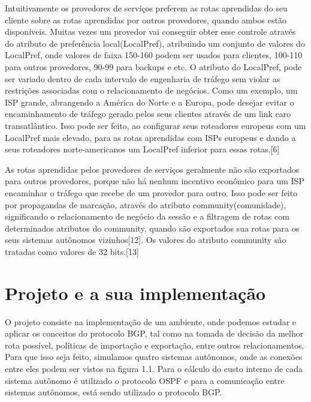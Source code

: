\documentclass[12pt,a4paper]{report}
\begin{document}
Intuitivamente os provedores de servi\c{c}os preferem as rotas aprendidas do seu cliente sobre as rotas aprendidas por outros provedores, quando ambos est\~ao dispon\'iveis. Muitas vezes um provedor vai conseguir obter esse controle atrav\'es do atributo de prefer\^encia local(LocalPref), atribuindo um conjunto de valores do LocalPref, onde valores de faixa 150-160 podem ser usados para clientes, 100-110 para outros provedores, 90-99 para backups e etc. O atributo do LocalPref, pode ser variado dentro de cada intervalo de engenharia de tr\'afego sem violar as restri\c{c}\~oes associadas com o relacionamento de neg\'ocios. Como um exemplo, um ISP grande, abrangendo a Am\'erica do Norte e a Europa, pode desejar evitar o encaminhamento de tr\'afego gerado pelos seus clientes atrav\'es de um link caro transatl\^antico. Isso pode ser feito, ao configurar seus roteadores europeus com um LocalPref mais elevado, para as rotas aprendidas com ISPs europeus e dando a seus roteadores norte-americanos um LocalPref inferior para essas rotas.[6]

As rotas aprendidas pelos provedores de servi\c{c}os geralmente n\~ao s\~ao exportados para outros provedores, porque n\~ao h\'a nenhum incentivo econ\^omico para um ISP encaminhar o tr\'afego que recebe de um provedor para outro. Isso pode ser feito por propagandas de marca\c{c}\~ao, atrav\'es do atributo community(comunidade), significando o relacionamento de neg\'ocio da sess\~ao e a filtragem de rotas com determinados atributos do community, quando s\~ao exportados sua rotas para os seus sistemas aut\^onomos vizinhos[12]. Os valores do atributo community s\~ao tratadas como valores de 32 bits.[13]

\chapter{Projeto e a sua implementa\c{c}\~ao}

O projeto consiste na implementa\c{c}\~ao de um ambiente, onde podemos estudar e aplicar os conceitos do protocolo BGP, tal como na tomada de decis\~ao da melhor rota poss\'ivel, pol\'iticas de importa\c{c}\~ao e exporta\c{c}\~ao, entre outros relacionamentos. Para que isso seja feito, simulamos quatro sistemas aut\^onomos, onde as conex\~oes entre eles podem ser vistos na figura 1.1. Para o c\'alculo do custo interno de cada sistema aut\^onomo \'e utilizado o protocolo OSPF e para a comunica\c{c}\~ao entre sistemas aut\^onomos, est\'a sendo utilizado o protocolo BGP.
\end{document}
